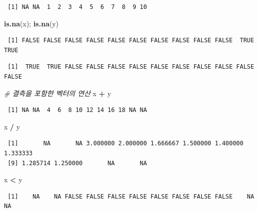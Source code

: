 \documentclass[
  11pt,
]{krantz}
\newenvironment{Shaded}{\begin{snugshade}}{\end{snugshade}}
\newcommand{\CommentTok}[1]{\textcolor[rgb]{0.37,0.37,0.37}{\textit{#1}}}
\newcommand{\KeywordTok}[1]{\textcolor[rgb]{0.27,0.27,0.27}{\textbf{#1}}}
\newcommand{\NormalTok}[1]{#1}
\newcommand{\OperatorTok}[1]{\textcolor[rgb]{0.43,0.43,0.43}{\textbf{#1}}}
\newcommand{\StringTok}[1]{\textcolor[rgb]{0.5,0.5,0.5}{#1}}
\begin{document}
\begin{verbatim}
 [1] NA NA  1  2  3  4  5  6  7  8  9 10
\end{verbatim}

\begin{Shaded}
\begin{Highlighting}[]
\KeywordTok{is.na}\NormalTok{(x); }\KeywordTok{is.na}\NormalTok{(y)}
\end{Highlighting}
\end{Shaded}

\begin{verbatim}
 [1] FALSE FALSE FALSE FALSE FALSE FALSE FALSE FALSE FALSE FALSE  TRUE  TRUE
\end{verbatim}

\begin{verbatim}
 [1]  TRUE  TRUE FALSE FALSE FALSE FALSE FALSE FALSE FALSE FALSE FALSE FALSE
\end{verbatim}

\begin{Shaded}
\begin{Highlighting}[]
\CommentTok{# 결측을 포함한 벡터의 연산 }
\NormalTok{x }\OperatorTok{+}\StringTok{ }\NormalTok{y}
\end{Highlighting}
\end{Shaded}

\begin{verbatim}
 [1] NA NA  4  6  8 10 12 14 16 18 NA NA
\end{verbatim}

\begin{Shaded}
\begin{Highlighting}[]
\NormalTok{x }\OperatorTok{/}\StringTok{ }\NormalTok{y}
\end{Highlighting}
\end{Shaded}

\begin{verbatim}
 [1]       NA       NA 3.000000 2.000000 1.666667 1.500000 1.400000 1.333333
 [9] 1.285714 1.250000       NA       NA
\end{verbatim}

\begin{Shaded}
\begin{Highlighting}[]
\NormalTok{x }\OperatorTok{<}\StringTok{ }\NormalTok{y}
\end{Highlighting}
\end{Shaded}

\begin{verbatim}
 [1]    NA    NA FALSE FALSE FALSE FALSE FALSE FALSE FALSE FALSE    NA    NA
\end{verbatim}
\end{document}
